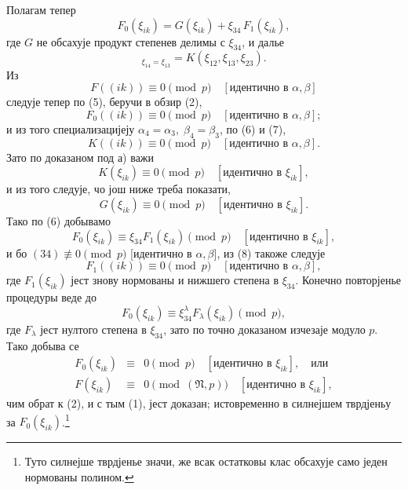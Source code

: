 ﻿\documentclass[11pt]{article}
\providecommand{\frN}{\mathfrak N}
\begin{document}
Полагам тепер
\begin{equation}
        F_0(\xi_{ik})=G(\xi_{ik})+\xi_{34}\,F_1(\xi_{ik}),
\end{equation}
где \(G\) не обсахује продукт степенев делимы с \(\xi_{34}\), и далье
\begin{equation}
        [G]_{\xi_{14}=\xi_{13}}=K(\xi_{12},\xi_{13},\xi_{23}).
\end{equation}
Из
\[
        F((ik))\equiv0\pmod p\quad[\text{идентично в \(\alpha,\beta\)}]
\]
следује тепер по (5), беручи в обзир (2),
\begin{equation}
        F_0((ik))\equiv0\pmod p\quad [\text{идентично в \(\alpha,\beta\)}];
\end{equation}
и из того специализацијеју \(\alpha_4=\alpha_3,\;\beta_4=\beta_3\), по (6) и (7),
\[
        K((ik))\equiv0\pmod p\quad [\text{идентично в \(\alpha,\beta\)}].
\]
Зато по доказаном под а) важи
\[
        K(\xi_{ik})\equiv0\pmod p\quad [\text{идентично в \(\xi_{ik}\)}],
\]
и из того следује, чо још ниже треба показати,
\[
        G(\xi_{ik})\equiv0\pmod p\quad [\text{идентично в \(\xi_{ik}\)}].
\]
Тако по (6) добывамо
\[
        F_0(\xi_{ik})\equiv\xi_{34}F_1(\xi_{ik})\pmod p\quad [\text{идентично в \(\xi_{ik}\)}],
\]
и бо \((34)\not\equiv0\pmod p\) [идентично в \(\alpha,\beta\)], из (8) такоже следује
\[
        F_1((ik))\equiv0\pmod p\quad [\text{идентично в \(\alpha,\beta\)}],
\]
где \(F_1(\xi_{ik})\) јест знову нормованы и нижшего степена в \(\xi_{34}\). Конечно повторјенье процедуры веде до
\[
        F_0(\xi_{ik})\equiv\xi_{34}^{\lambda}F_\lambda(\xi_{ik})\pmod p,
\]
где \(F_\lambda\) јест нултого степена в \(\xi_{34}\), зато по точно доказаном изчезаје модуло \(p\). Тако добыва се
\begin{equation}
\begin{array}{rcl}
        F_0(\xi_{ik})&\equiv&0\pmod p\quad [\text{идентично в \(\xi_{ik}\)}],\quad\text{или}\\
        F(\xi_{ik})&\equiv&0\pmod{(\frN,p)}\quad [\text{идентично в \(\xi_{ik}\)}],
\end{array}
\end{equation}
чим обрат к (2), и с тым (1), јест доказан; истовременно в силнејшем тврдјеньу за \(F_0(\xi_{ik})\).\footnote{Туто силнејше тврдјенье значи, же всак остатковы клас обсахује само једен нормованы полином.}
\end{document}
